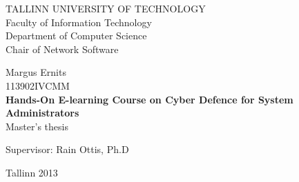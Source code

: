 \begin{titlepage}
	\begingroup
		\singlespace
		\begin{center}
			TALLINN UNIVERSITY OF TECHNOLOGY \\
			Faculty of Information Technology \\
			Department of Computer Science \\
			Chair of Network Software
		
			\vfill
				Margus Ernits \\
				113902IVCMM \\[1.5cm]
				\LARGE \textbf{Hands-On E-learning Course on Cyber Defence for System Administrators} \\[1cm]
				\normalsize Master's thesis \\[4cm]

				\begin{flushright}
					Supervisor: Rain Ottis, Ph.D \\
					
				\end{flushright}
			\vfill

			Tallinn 2013
		\end{center}
	\endgroup
\end{titlepage}
